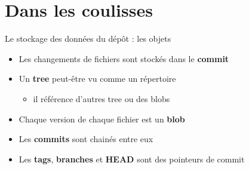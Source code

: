 \documentclass[xcolor=x11names,compress]{beamer}
\begin{document}
\section{Dans les coulisses}
\begin{frame}{Le stockage des données du dépôt : les objets}
		\begin{itemize}
			\item<1-> Les changements de fichiers sont stockés dans le \textbf{commit}
			\item<2-> Un \textbf{tree} peut-être vu comme un répertoire 
				\begin{itemize}
					\item il référence d'autres tree ou des blobs
				\end{itemize}
			\item<3-> Chaque version de chaque fichier est un \textbf{blob}
			\item<4-> Les \textbf{commits} sont chainés entre eux
			\item<5-> Les \textbf{tags}, \textbf{branches} et \textbf{HEAD} sont des pointeurs de commit
		\end{itemize}
		\begin{figure}[H]
			\centering
\end{figure}
\end{frame}
\end{document}
